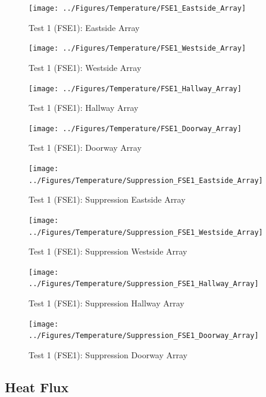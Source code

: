 \documentclass[12pt,oneside]{book}
\begin{document}
\begin{figure}[!ht]
	\texttt{[image: ../Figures/Temperature/FSE1\_Eastside\_Array]}
	\caption{Test 1 (FSE1): Eastside Array}
	\label{fig:Test_1_Eastside_Array}
\end{figure}

\begin{figure}[!ht]
	\texttt{[image: ../Figures/Temperature/FSE1\_Westside\_Array]}
	\caption{Test 1 (FSE1): Westside Array}
	\label{fig:Test_1_Westside_Array}
\end{figure}

\begin{figure}[!ht]
	\texttt{[image: ../Figures/Temperature/FSE1\_Hallway\_Array]}
	\caption{Test 1 (FSE1): Hallway Array}
	\label{fig:Test_1_Hallway_Array}
\end{figure}

\begin{figure}[!ht]
	\texttt{[image: ../Figures/Temperature/FSE1\_Doorway\_Array]}
	\caption{Test 1 (FSE1): Doorway Array}
	\label{fig:Test_1_Doorway_Array}
\end{figure}

\begin{figure}[!ht]
	\texttt{[image: ../Figures/Temperature/Suppression\_FSE1\_Eastside\_Array]}
	\caption{Test 1 (FSE1): Suppression Eastside Array}
	\label{fig:Test_1_Suppression_Eastside_Array}
\end{figure}

\begin{figure}[!ht]
	\texttt{[image: ../Figures/Temperature/Suppression\_FSE1\_Westside\_Array]}
	\caption{Test 1 (FSE1): Suppression Westside Array}
	\label{fig:Test_1_Suppression_Westside_Array}
\end{figure}

\begin{figure}[!ht]
	\texttt{[image: ../Figures/Temperature/Suppression\_FSE1\_Hallway\_Array]}
	\caption{Test 1 (FSE1): Suppression Hallway Array}
	\label{fig:Test_1_Suppression_Hallway_Array}
\end{figure}

\begin{figure}[!ht]
	\texttt{[image: ../Figures/Temperature/Suppression\_FSE1\_Doorway\_Array]}
	\caption{Test 1 (FSE1): Suppression Doorway Array}
	\label{fig:Test_1_Suppression_Doorway_Array}
\end{figure}

\subsection{Heat Flux}
\label{subsec:Heat_Flux}
\end{document}
